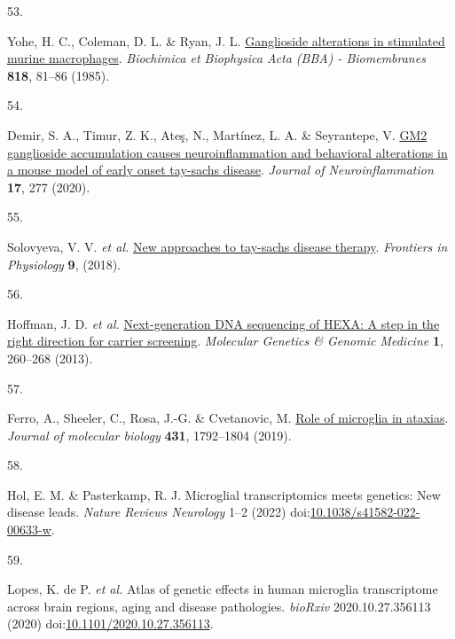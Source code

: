 \documentclass[
]{agujournal2019}
\newlength{\cslhangindent}
\newlength{\csllabelwidth}
\newenvironment{CSLReferences}[2] %
 {\begin{list}{}{%
  \setlength{\itemindent}{0pt}
  \setlength{\leftmargin}{0pt}
  \setlength{\parsep}{0pt}
  \ifodd #1
   \setlength{\leftmargin}{\cslhangindent}
   \setlength{\itemindent}{-1\cslhangindent}
  \fi
  \setlength{\itemsep}{#2\baselineskip}}}
 {\end{list}}
\newcommand{\CSLLeftMargin}[1]{\parbox[t]{\csllabelwidth}{\strut#1\strut}}
\newcommand{\CSLRightInline}[1]{\parbox[t]{\linewidth - \csllabelwidth}{\strut#1\strut}}
\begin{document}
\begin{CSLReferences}{0}{0}
\CSLLeftMargin{53. }%
\CSLRightInline{Yohe, H. C., Coleman, D. L. \& Ryan, J. L.
\href{https://doi.org/10.1016/0005-2736(85)90141-5}{Ganglioside
alterations in stimulated murine macrophages}. \emph{Biochimica et
Biophysica Acta (BBA) - Biomembranes} \textbf{818}, 81--86 (1985).}

\CSLLeftMargin{54. }%
\CSLRightInline{Demir, S. A., Timur, Z. K., Ateş, N., Martínez, L. A. \&
Seyrantepe, V. \href{https://doi.org/10.1186/s12974-020-01947-6}{GM2
ganglioside accumulation causes neuroinflammation and behavioral
alterations in a mouse model of early onset tay-sachs disease}.
\emph{Journal of Neuroinflammation} \textbf{17}, 277 (2020).}

\CSLLeftMargin{55. }%
\CSLRightInline{Solovyeva, V. V. \emph{et al.}
\href{https://doi.org/10.3389/fphys.2018.01663}{New approaches to
tay-sachs disease therapy}. \emph{Frontiers in Physiology} \textbf{9},
(2018).}

\CSLLeftMargin{56. }%
\CSLRightInline{Hoffman, J. D. \emph{et al.}
\href{https://doi.org/10.1002/mgg3.37}{Next-generation DNA sequencing of
HEXA: A step in the right direction for carrier screening}.
\emph{Molecular Genetics \& Genomic Medicine} \textbf{1}, 260--268
(2013).}

\CSLLeftMargin{57. }%
\CSLRightInline{Ferro, A., Sheeler, C., Rosa, J.-G. \& Cvetanovic, M.
\href{https://doi.org/10.1016/j.jmb.2019.01.016}{Role of microglia in
ataxias}. \emph{Journal of molecular biology} \textbf{431}, 1792--1804
(2019).}

\CSLLeftMargin{58. }%
\CSLRightInline{Hol, E. M. \& Pasterkamp, R. J. Microglial
transcriptomics meets genetics: New disease leads. \emph{Nature Reviews
Neurology} 1--2 (2022)
doi:\href{https://doi.org/10.1038/s41582-022-00633-w}{10.1038/s41582-022-00633-w}.}

\CSLLeftMargin{59. }%
\CSLRightInline{Lopes, K. de P. \emph{et al.} Atlas of genetic effects
in human microglia transcriptome across brain regions, aging and disease
pathologies. \emph{bioRxiv} 2020.10.27.356113 (2020)
doi:\href{https://doi.org/10.1101/2020.10.27.356113}{10.1101/2020.10.27.356113}.}


\end{CSLReferences}
\end{document}
